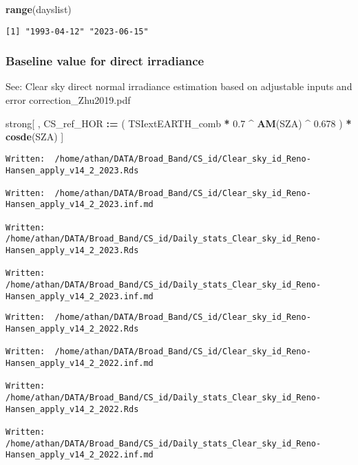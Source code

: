 \documentclass[
  10pt,
  a4paper,oneside]{article}
\newenvironment{Shaded}{\begin{snugshade}}{\end{snugshade}}
\newcommand{\ErrorTok}[1]{\textcolor[rgb]{0.64,0.00,0.00}{\textbf{#1}}}
\newcommand{\FloatTok}[1]{\textcolor[rgb]{0.00,0.00,0.81}{#1}}
\newcommand{\KeywordTok}[1]{\textcolor[rgb]{0.13,0.29,0.53}{\textbf{#1}}}
\newcommand{\NormalTok}[1]{#1}
\newcommand{\OperatorTok}[1]{\textcolor[rgb]{0.81,0.36,0.00}{\textbf{#1}}}
\newcommand{\StringTok}[1]{\textcolor[rgb]{0.31,0.60,0.02}{#1}}
\begin{document}
\begin{Shaded}
\begin{Highlighting}[]
\KeywordTok{range}\NormalTok{(dayslist)}
\end{Highlighting}
\end{Shaded}

\begin{verbatim}
[1] "1993-04-12" "2023-06-15"
\end{verbatim}

\hypertarget{baseline-value-for-direct-irradiance}{%
\subsubsection{Baseline value for direct irradiance}\label{baseline-value-for-direct-irradiance}}

See: Clear sky direct normal irradiance estimation based on adjustable inputs and error correction\_Zhu2019.pdf

\begin{Shaded}
\begin{Highlighting}[]
\NormalTok{strong[ , CS\_ref\_HOR }\OperatorTok{:}\ErrorTok{=}\StringTok{ }\NormalTok{( TSIextEARTH\_comb }\OperatorTok{*}\StringTok{ }\FloatTok{0.7} \OperatorTok{\^{}}\StringTok{ }\KeywordTok{AM}\NormalTok{(SZA) }\OperatorTok{\^{}}\StringTok{ }\FloatTok{0.678}\NormalTok{ ) }\OperatorTok{*}\StringTok{ }\KeywordTok{cosde}\NormalTok{(SZA) ]}
\end{Highlighting}
\end{Shaded}

\begin{verbatim}
Written:  /home/athan/DATA/Broad_Band/CS_id/Clear_sky_id_Reno-Hansen_apply_v14_2_2023.Rds 

Written:  /home/athan/DATA/Broad_Band/CS_id/Clear_sky_id_Reno-Hansen_apply_v14_2_2023.inf.md 

Written:  /home/athan/DATA/Broad_Band/CS_id/Daily_stats_Clear_sky_id_Reno-Hansen_apply_v14_2_2023.Rds 

Written:  /home/athan/DATA/Broad_Band/CS_id/Daily_stats_Clear_sky_id_Reno-Hansen_apply_v14_2_2023.inf.md 
\end{verbatim}

\begin{verbatim}
Written:  /home/athan/DATA/Broad_Band/CS_id/Clear_sky_id_Reno-Hansen_apply_v14_2_2022.Rds 

Written:  /home/athan/DATA/Broad_Band/CS_id/Clear_sky_id_Reno-Hansen_apply_v14_2_2022.inf.md 

Written:  /home/athan/DATA/Broad_Band/CS_id/Daily_stats_Clear_sky_id_Reno-Hansen_apply_v14_2_2022.Rds 

Written:  /home/athan/DATA/Broad_Band/CS_id/Daily_stats_Clear_sky_id_Reno-Hansen_apply_v14_2_2022.inf.md 
\end{verbatim}
\end{document}
